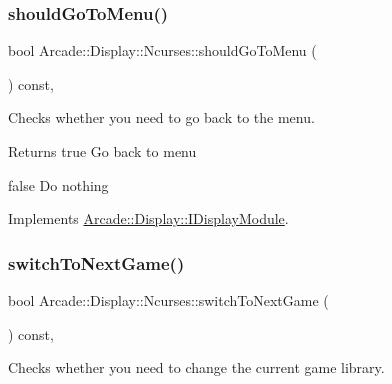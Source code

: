 \mbox{\label{classArcade_1_1Display_1_1Ncurses_a807e935000fce3f6f405cb6aa6239246}} 
\subsubsection{\texorpdfstring{shouldGoToMenu()}{shouldGoToMenu()}}
{\footnotesize\ttfamily bool Arcade\+::\+Display\+::\+Ncurses\+::should\+Go\+To\+Menu (\begin{DoxyParamCaption}{ }\end{DoxyParamCaption}) const\hspace{0.3cm}{\ttfamily [final]}, {\ttfamily [virtual]}}



Checks whether you need to go back to the menu. 

\begin{DoxyReturn}{Returns}
true Go back to menu 

false Do nothing 
\end{DoxyReturn}


Implements \mbox{\hyperlink{classArcade_1_1Display_1_1IDisplayModule_ad060f6b99f2adffaf02a4226fc40d0ab}{Arcade\+::\+Display\+::\+I\+Display\+Module}}.

\mbox{\label{classArcade_1_1Display_1_1Ncurses_a915b07b0cc03a96303c0d01b59652996}} 
\subsubsection{\texorpdfstring{switchToNextGame()}{switchToNextGame()}}
{\footnotesize\ttfamily bool Arcade\+::\+Display\+::\+Ncurses\+::switch\+To\+Next\+Game (\begin{DoxyParamCaption}{ }\end{DoxyParamCaption}) const\hspace{0.3cm}{\ttfamily [final]}, {\ttfamily [virtual]}}



Checks whether you need to change the current game library. 

